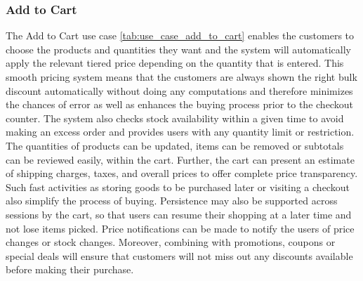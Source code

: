 \subsubsection{Add to Cart}
The Add to Cart use case \ref{tab:use_case_add_to_cart} enables the customers to choose the products and quantities they want and the system will automatically apply the relevant tiered price depending on the quantity that is entered. This smooth pricing system means that the customers are always shown the right bulk discount automatically without doing any computations and therefore minimizes the chances of error as well as enhances the buying process prior to the checkout counter. The system also checks stock availability within a given time to avoid making an excess order and provides users with any quantity limit or restriction. The quantities of products can be updated, items can be removed or subtotals can be reviewed easily, within the cart. Further, the cart can present an estimate of shipping charges, taxes, and overall prices to offer complete price transparency. Such fast activities as storing goods to be purchased later or visiting a checkout also simplify the process of buying. Persistence may also be supported across sessions by the cart, so that users can resume their shopping at a later time and not lose items picked. Price notifications can be made to notify the users of price changes or stock changes. Moreover, combining with promotions, coupons or special deals will ensure that customers will not miss out any discounts available before making their purchase.

